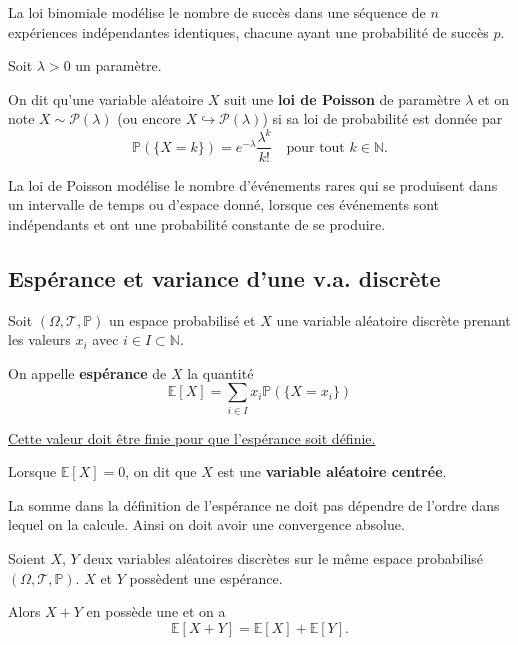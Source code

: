 \documentclass[a4paper,12pt]{article}
\begin{document}
\begin{remarque}
    La loi binomiale modélise le nombre de succès dans une séquence de $n$ expériences indépendantes identiques, chacune ayant une probabilité de succès $p$.
\end{remarque}

\begin{definition}
    Soit $\lambda > 0$ un paramètre.

    On dit qu'une variable aléatoire $X$ suit une \textbf{loi de Poisson} de paramètre $\lambda$ et on note $X \sim \mathcal{P}(\lambda)$ (ou encore $X \hookrightarrow \mathcal{P}(\lambda)$) si sa loi de probabilité est donnée par
    $$
    \mathbb{P}(\{ X = k \}) = e^{-\lambda} \frac{\lambda^k}{k!} \quad \text{pour tout } k \in \mathbb{N}.
    $$
\end{definition}

\begin{remarque}
    La loi de Poisson modélise le nombre d'événements rares qui se produisent dans un intervalle de temps ou d'espace donné, lorsque ces événements sont indépendants et ont une probabilité constante de se produire.
\end{remarque}

\subsection{Espérance et variance d'une v.a. discrète}

\begin{definition}
    Soit $(\Omega, \mathcal{T}, \mathbb{P})$ un espace probabilisé et $X$ une variable aléatoire discrète prenant les valeurs $x_i$ avec $i \in I \subset \mathbb{N}$.

    On appelle \textbf{espérance} de $X$ la quantité
    $$
    \mathbb{E}[X] = \sum_{i \in I} x_i \mathbb{P}(\{ X = x_i \})
    $$

    \underline{Cette valeur doit être finie pour que l'espérance soit définie.}

    Lorsque $\mathbb{E}[X] = 0$, on dit que $X$ est une \textbf{variable aléatoire centrée}.
\end{definition}

\begin{remarque}
    La somme dans la définition de l'espérance ne doit pas dépendre de l'ordre dans lequel on la calcule. Ainsi on doit avoir une convergence absolue.
\end{remarque}

\begin{theoreme}{}{}
    Soient $X$, $Y$ deux variables aléatoires discrètes sur le même espace probabilisé $(\Omega, \mathcal{T}, \mathbb{P})$.
    $X$ et $Y$ possèdent une espérance.

    Alors $X + Y$ en possède une et on a
    $$
    \mathbb{E}[X + Y] = \mathbb{E}[X] + \mathbb{E}[Y].
    $$
\end{theoreme}
\end{document}

